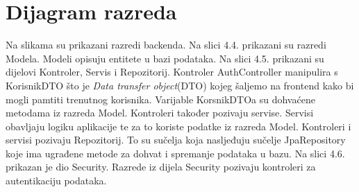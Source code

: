			\eject
			
			
		\section{Dijagram razreda}
		
			Na slikama su prikazani razredi backenda. Na slici 4.4. prikazani su razredi Modela. Modeli opisuju entitete u bazi podataka. Na slici 4.5. prikazani su dijelovi Kontroler, Servis i Repozitorij. Kontroler AuthController manipulira s KorisnikDTO što je \textit{Data transfer object}(DTO) kojeg šaljemo na frontend kako bi mogli pamtiti trenutnog korisnika. Varijable KorsnikDTOa su dohvaćene metodama iz razreda Model.
			Kontroleri također pozivaju servise. Servisi obavljaju logiku aplikacije te za to koriste podatke iz razreda Model. Kontroleri i servisi pozivaju Repozitorij. To su sučelja koja nasljeđuju sučelje JpaRepository koje ima ugrađene metode za dohvat i spremanje podataka u bazu. Na slici 4.6. prikazan je dio Security. Razrede iz dijela Security pozivaju kontroleri za autentikaciju podataka.
		
